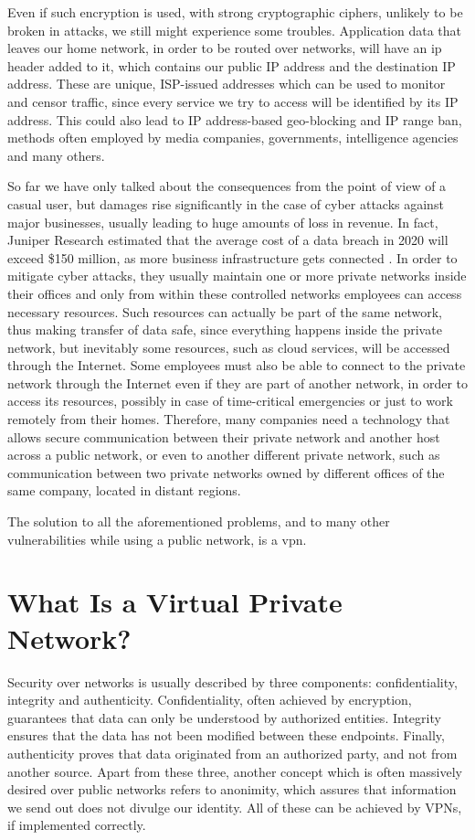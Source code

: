 \documentclass[a4paper,12pt]{report}
\begin{document}
		Even if such encryption is used, with strong cryptographic ciphers, unlikely to be broken in attacks, we still might experience some troubles. Application data that leaves our home network, in order to be routed over networks, will have an \acrfull{ip} header added to it, which contains our public IP address and the destination IP address. These are unique, ISP-issued addresses which can be used to monitor and censor traffic, since every service we try to access will be identified by its IP address. This could also lead to IP address-based geo-blocking and IP range ban, methods often employed by media companies, governments, intelligence agencies and many others.
		
		So far we have only talked about the consequences from the point of view of a casual user, but damages rise significantly in the case of cyber attacks against major businesses, usually leading to huge amounts of loss in revenue. In fact, Juniper Research estimated that the average cost of a data breach in 2020 will exceed \$150 million, as more business infrastructure gets connected \cite{junipercybercrime}. In order to mitigate cyber attacks, they usually maintain one or more private networks inside their offices and only from within these controlled networks employees can access necessary resources. Such resources can actually be part of the same network, thus making transfer of data safe, since everything happens inside the private network, but inevitably some resources, such as cloud services, will be accessed through the Internet. Some employees must also be able to connect to the private network through the Internet even if they are part of another network, in order to access its resources, possibly in case of time-critical emergencies or just to work remotely from their homes. Therefore, many companies need a technology that allows secure communication between their private network and another host across a public network, or even to another different private network, such as communication between two private networks owned by different offices of the same company, located in distant regions.
		
		The solution to all the aforementioned problems, and to many other vulnerabilities while using a public network, is a \acrfull{vpn}.
		
		\section{What Is a Virtual Private Network?}
		Security over networks is usually described by three components: confidentiality, integrity and authenticity. Confidentiality, often achieved by encryption, guarantees that data can only be understood by authorized entities. Integrity ensures that the data has not been modified between these endpoints. Finally, authenticity proves that data originated from an authorized party, and not from another source. Apart from these three, another concept which is often massively desired over public networks refers to anonimity, which assures that information we send out does not divulge our identity. All of these can be achieved by VPNs, if implemented correctly.
		
\end{document}
